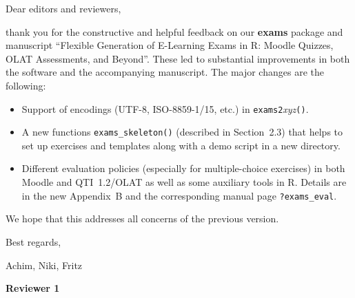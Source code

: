 \documentclass[a4paper]{article}
\begin{document}
\noindent
Dear editors and reviewers,

\noindent
thank you for the constructive and helpful feedback on our \textbf{exams}
package and manuscript
``Flexible Generation of E-Learning Exams in R: Moodle Quizzes, OLAT Assessments, and Beyond''.
These led to substantial improvements in both the software and the accompanying
manuscript. The major changes are the following:
\begin{itemize}
  \item Support of encodings (UTF-8, ISO-8859-1/15, etc.)
        in \texttt{exams2}\emph{xyz}\texttt{()}.

  \item A new functions \verb|exams_skeleton()| (described in Section~2.3)
        that helps to set up exercises and templates along with a demo
	script in a new directory.

  \item Different evaluation policies (especially for multiple-choice exercises)
        in both Moodle and QTI~1.2/OLAT as well as some auxiliary tools in \textsf{R}.
	Details are in the new Appendix~B and the corresponding manual page
	\verb|?exams_eval|.
\end{itemize}
We hope that this addresses all concerns of the previous version.


\noindent
Best regards,

\noindent
Achim, Niki, Fritz

\newpage

\textbf{\Large Reviewer 1}

\medskip
\end{document}
